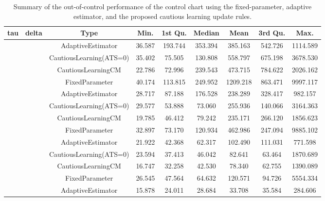 \begin{table}[!h]

\caption{Summary of the out-of-control performance of the control chart using the fixed-parameter, adaptive estimator, and the proposed cautious learning update rules.}
\centering
\begin{tabular}[t]{ccccccccc}
\toprule
tau & delta & Type & Min. & 1st Qu. & Median & Mean & 3rd Qu. & Max.\\
\midrule
 &  & AdaptiveEstimator & 36.587 & 193.744 & 353.394 & 385.163 & 542.726 & 1114.589\\

 &  & CautiousLearning(ATS=0) & 35.402 & 75.505 & 130.808 & 558.797 & 675.198 & 3678.530\\

 &  & CautiousLearningCM & 22.786 & 72.996 & 239.543 & 473.715 & 784.622 & 2026.162\\

 & \multirow[t]{-4}{*}{\centering\arraybackslash 0.25} & FixedParameter & 40.174 & 113.815 & 249.952 & 1209.218 & 863.471 & 9997.117\\
\cmidrule{2-9}
 &  & AdaptiveEstimator & 28.717 & 87.188 & 176.528 & 238.289 & 328.417 & 982.157\\

 &  & CautiousLearning(ATS=0) & 29.577 & 53.888 & 73.060 & 255.936 & 140.066 & 3164.363\\

 &  & CautiousLearningCM & 19.785 & 46.412 & 79.242 & 235.171 & 266.120 & 1856.623\\

 & \multirow[t]{-4}{*}{\centering\arraybackslash 0.35} & FixedParameter & 32.897 & 73.170 & 120.934 & 462.986 & 247.094 & 9885.102\\
\cmidrule{2-9}
 &  & AdaptiveEstimator & 21.922 & 42.368 & 62.317 & 102.490 & 111.031 & 771.598\\

 &  & CautiousLearning(ATS=0) & 23.594 & 37.413 & 46.042 & 82.641 & 63.464 & 1870.689\\

 &  & CautiousLearningCM & 16.747 & 32.258 & 42.530 & 78.340 & 62.755 & 1390.089\\

 & \multirow[t]{-4}{*}{\centering\arraybackslash 0.50} & FixedParameter & 26.545 & 47.564 & 64.632 & 120.571 & 94.726 & 5554.334\\
\cmidrule{2-9}
 &  & AdaptiveEstimator & 15.878 & 24.011 & 28.684 & 33.708 & 35.584 & 284.606\\


\end{tabular}
\end{table}
